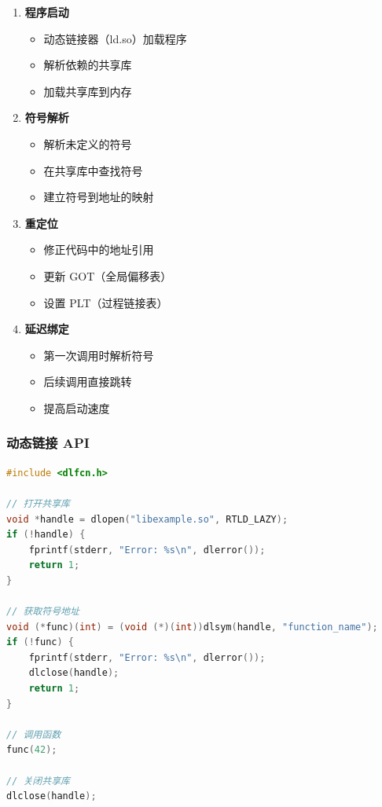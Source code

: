 \begin{enumerate}
  \item \textbf{程序启动}
    \begin{itemize}
      \item 动态链接器（ld.so）加载程序
      \item 解析依赖的共享库
      \item 加载共享库到内存
    \end{itemize}

  \item \textbf{符号解析}
    \begin{itemize}
      \item 解析未定义的符号
      \item 在共享库中查找符号
      \item 建立符号到地址的映射
    \end{itemize}

  \item \textbf{重定位}
    \begin{itemize}
      \item 修正代码中的地址引用
      \item 更新 GOT（全局偏移表）
      \item 设置 PLT（过程链接表）
    \end{itemize}

  \item \textbf{延迟绑定}
    \begin{itemize}
      \item 第一次调用时解析符号
      \item 后续调用直接跳转
      \item 提高启动速度
    \end{itemize}
\end{enumerate}

\subsubsection{动态链接 API}

\begin{lstlisting}[language=C]
#include <dlfcn.h>

// 打开共享库
void *handle = dlopen("libexample.so", RTLD_LAZY);
if (!handle) {
    fprintf(stderr, "Error: %s\n", dlerror());
    return 1;
}

// 获取符号地址
void (*func)(int) = (void (*)(int))dlsym(handle, "function_name");
if (!func) {
    fprintf(stderr, "Error: %s\n", dlerror());
    dlclose(handle);
    return 1;
}

// 调用函数
func(42);

// 关闭共享库
dlclose(handle);
\end{lstlisting}

